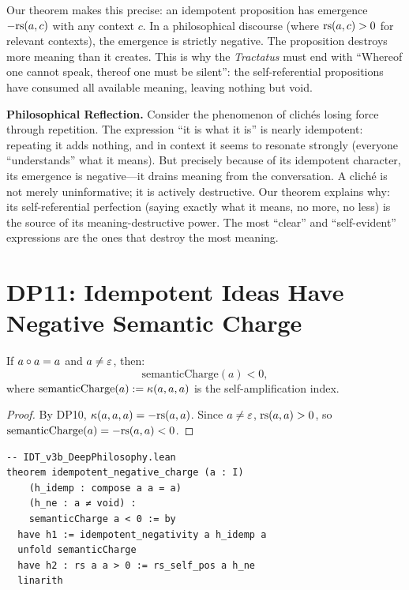 Our theorem makes this precise: an idempotent proposition has emergence
$-\mathrm{rs}(a, c)$ with any context $c$. In a philosophical discourse (where
$\mathrm{rs}(a, c) > 0$ for relevant contexts), the emergence is strictly
negative. The proposition destroys more meaning than it creates. This is
why the \textit{Tractatus} must end with ``Whereof one cannot speak,
thereof one must be silent'': the self-referential propositions have
consumed all available meaning, leaving nothing but void.

\begin{reflectionbox}
\textbf{Philosophical Reflection.}
Consider the phenomenon of clich\'es losing force through repetition. The
expression ``it is what it is'' is nearly idempotent: repeating it adds
nothing, and in context it seems to resonate strongly (everyone
``understands'' what it means). But precisely because of its idempotent
character, its emergence is negative---it drains meaning from the
conversation. A clich\'e is not merely uninformative; it is actively
destructive. Our theorem explains why: its self-referential perfection
(saying exactly what it means, no more, no less) is the source of
its meaning-destructive power. The most ``clear'' and ``self-evident''
expressions are the ones that destroy the most meaning.
\end{reflectionbox}

\section{DP11: Idempotent Ideas Have Negative Semantic Charge}

\begin{theorem}
\label{thm:idempotent-negative-charge}
If $a \circ a = a$ and $a \neq \varepsilon$, then:
\[
\mathrm{semanticCharge}(a) < 0,
\]
where $\mathrm{semanticCharge}(a) := \kappa(a, a, a)$ is the
self-amplification index.
\end{theorem}

\begin{proof}
By DP10, $\kappa(a, a, a) = -\mathrm{rs}(a, a)$. Since $a \neq \varepsilon$,
$\mathrm{rs}(a, a) > 0$, so $\mathrm{semanticCharge}(a) = -\mathrm{rs}(a, a) < 0$.
\end{proof}

\begin{lstlisting}
-- IDT_v3b_DeepPhilosophy.lean
theorem idempotent_negative_charge (a : I)
    (h_idemp : compose a a = a)
    (h_ne : a ≠ void) :
    semanticCharge a < 0 := by
  have h1 := idempotent_negativity a h_idemp a
  unfold semanticCharge
  have h2 : rs a a > 0 := rs_self_pos a h_ne
  linarith
\end{lstlisting}

